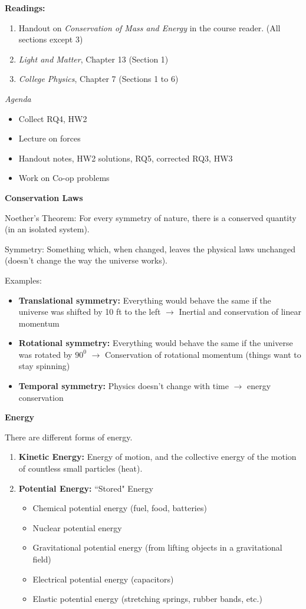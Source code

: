 \documentclass[12pt]{article}
\begin{document}
\noindent \textbf{Readings:}
\begin{enumerate}
\item Handout on \textit{Conservation of Mass and Energy} in the course reader. (All sections except 3)
\item \textit{Light and Matter}, Chapter 13 (Section 1)
\item \textit{College Physics}, Chapter 7 (Sections 1 to 6)
\end{enumerate}

\noindent \textit{Agenda}
\begin{itemize}
\item Collect RQ4, HW2
\item Lecture on forces
\item Handout notes, HW2 solutions, RQ5, corrected RQ3, HW3
\item Work on Co-op problems
\end{itemize}

\noindent\textbf{\large Conservation Laws}

Noether's Theorem: For every symmetry of nature, there is a conserved quantity (in an isolated system).

Symmetry: Something which, when changed, leaves the physical laws unchanged (doesn't change the way the universe works).

Examples:
\begin{itemize}
	\item \textbf{Translational symmetry:} Everything would behave the same if the universe was shifted by 10 ft to the left $\rightarrow$ Inertial and conservation of linear momentum
	\item \textbf{Rotational symmetry:} Everything would behave the same if the universe was rotated by $90^0$ $\rightarrow$ Conservation of rotational momentum (things want to stay spinning)
	\item \textbf{Temporal symmetry:} Physics doesn't change with time $\rightarrow$ energy conservation
\end{itemize}

\noindent\textbf{\large Energy}

There are different forms of energy.
\begin{enumerate}
	\item \textbf{Kinetic Energy:} Energy of motion, and the collective energy of the motion of countless small particles (heat).
	\item \textbf{Potential Energy:} ``Stored" Energy
	\begin{itemize}
		\item Chemical potential energy (fuel, food, batteries)
		\item Nuclear potential energy
		\item Gravitational potential energy (from lifting objects in a gravitational field)
		\item Electrical potential energy (capacitors)
		\item Elastic potential energy (stretching springs, rubber bands, etc.)
	\end{itemize}
\end{enumerate}
\end{document}
